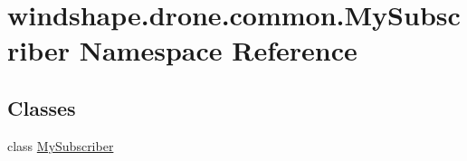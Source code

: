 \hypertarget{namespacewindshape_1_1drone_1_1common_1_1_my_subscriber}{}\section{windshape.\+drone.\+common.\+My\+Subscriber Namespace Reference}
\label{namespacewindshape_1_1drone_1_1common_1_1_my_subscriber}
\subsection*{Classes}
\begin{DoxyCompactItemize}
\item 
class \mbox{\hyperlink{classwindshape_1_1drone_1_1common_1_1_my_subscriber_1_1_my_subscriber}{My\+Subscriber}}
\end{DoxyCompactItemize}
